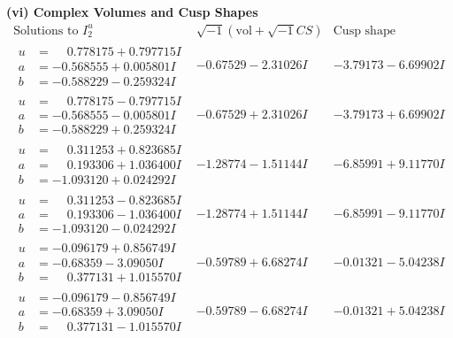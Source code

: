 \documentclass[1p]{elsarticle_modified}
\theoremstyle{definition}
\newcommand{\I}{\sqrt{-1}}
\begin{document}
\newpage\flushleft \textbf{(vi) Complex Volumes and Cusp Shapes}
$$\begin{array}{c|c|c}  
\text{Solutions to }I^u_{2}& \I (\text{vol} + \sqrt{-1}CS) & \text{Cusp shape}\\
 \hline 
\begin{aligned}
u &= \phantom{-}0.778175 + 0.797715 I \\
a &= -0.568555 + 0.005801 I \\
b &= -0.588229 - 0.259324 I\end{aligned}
 & -0.67529 - 2.31026 I & -3.79173 - 6.69902 I \\ \hline\begin{aligned}
u &= \phantom{-}0.778175 - 0.797715 I \\
a &= -0.568555 - 0.005801 I \\
b &= -0.588229 + 0.259324 I\end{aligned}
 & -0.67529 + 2.31026 I & -3.79173 + 6.69902 I \\ \hline\begin{aligned}
u &= \phantom{-}0.311253 + 0.823685 I \\
a &= \phantom{-}0.193306 + 1.036400 I \\
b &= -1.093120 + 0.024292 I\end{aligned}
 & -1.28774 - 1.51144 I & -6.85991 + 9.11770 I \\ \hline\begin{aligned}
u &= \phantom{-}0.311253 - 0.823685 I \\
a &= \phantom{-}0.193306 - 1.036400 I \\
b &= -1.093120 - 0.024292 I\end{aligned}
 & -1.28774 + 1.51144 I & -6.85991 - 9.11770 I \\ \hline\begin{aligned}
u &= -0.096179 + 0.856749 I \\
a &= -0.68359 - 3.09050 I \\
b &= \phantom{-}0.377131 + 1.015570 I\end{aligned}
 & -0.59789 + 6.68274 I & -0.01321 - 5.04238 I \\ \hline\begin{aligned}
u &= -0.096179 - 0.856749 I \\
a &= -0.68359 + 3.09050 I \\
b &= \phantom{-}0.377131 - 1.015570 I\end{aligned}
 & -0.59789 - 6.68274 I & -0.01321 + 5.04238 I \\ \hline\begin{aligned}

\end{aligned}
\end{array}$$
\end{document}
